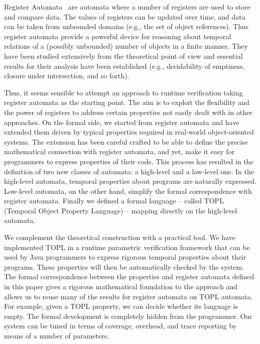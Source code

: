 \documentclass{article} %
\theoremstyle{definition}
\theoremstyle{remark}
\begin{document}
Register Automata~\cite{dblp:conf/focs/kaminskif90} are automata where
a number of registers are used to store and compare data. The values
of registers can be updated over time, and data can be taken from unbounded domains (e.g., the set of object references). Thus register automata provide a powerful device for reasoning about temporal 
relations of a (possibly unbounded) number of objects in a finite manner. They have been studied extensively from the theoretical point of
view and essential results for their analysis have been established (e.g., decidability of emptiness, closure under intersection, and so forth).

Thus, it seems sensible to attempt an approach to runtime verification
taking register automata as the starting point. The aim is to
exploit the flexibility and the power of registers to
address certain properties not easily dealt with in other approaches.
On the formal side, we started from register automata and have extended them driven by typical properties required in real-world object-oriented systems.
The extension has been careful crafted to be able to define the precise mathematical connection with register automata, and yet,
make it easy for programmers to express properties of their code. This process has resulted in the definition of two new classes of 
automata: a high-level and a low-level one. In the high-level automata, temporal properties about programs are naturally expressed. Low-level automata, 
on the other hand, simplify the formal correspondence with  register automata. 
Finally we defined a formal language -- called TOPL (Temporal Object Property Language) -- mapping directly on the 
high-level automata.

We complement the theoretical construction with a practical tool.
We have implemented TOPL  in a runtime parametric verification framework that can be used by Java programmers to express rigorous temporal 
properties about their programs. These properties will then be automatically checked by the system.
The formal correspondence between the properties and register automata
defined in this paper gives a rigorous mathematical foundation to
the approach and allows us to reuse many of the results for register automata on TOPL automata. For example, given a TOPL property, we can decide whether its language is empty.  The formal development is completely hidden from 
the programmer.  
Our system can be tuned  in terms of coverage,  overhead, and trace reporting by means of a number of parameters. 
\end{document}
